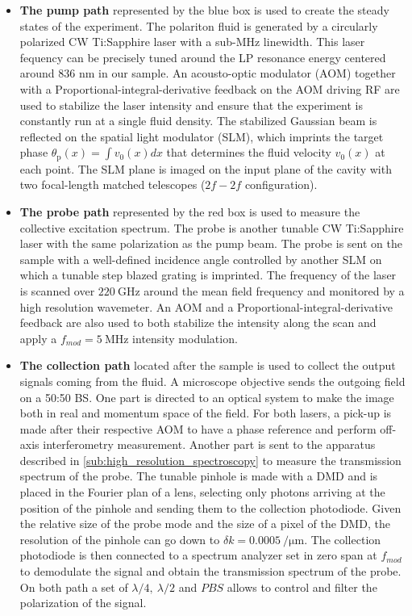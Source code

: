  \begin{itemize}
    \item \textbf{The pump path} represented by the blue box is used to create the steady states of the experiment. The polariton fluid is generated by a circularly polarized CW Ti:Sapphire laser with a sub-MHz linewidth. This laser fequency can be precisely tuned around the LP resonance energy centered around 836 nm in our sample. An acousto-optic modulator (AOM) 
    together with a Proportional-integral-derivative feedback on the AOM driving RF are used to stabilize the laser intensity and ensure that the experiment is constantly run at a single fluid density.
    The stabilized Gaussian beam is reflected on the spatial light modulator (SLM), which imprints the target phase $\theta_\mathrm{p}(x)=\int v_0(x)dx$ that determines the fluid velocity $v_0(x)$ at each point. The SLM plane is imaged on the input plane of the cavity with two focal-length matched telescopes ($2f-2f$ configuration).
    \item \textbf{The probe path} represented by the red box is used to measure the collective excitation spectrum. The probe is another tunable CW Ti:Sapphire laser with the same polarization as the pump beam. The probe is sent on the sample with a well-defined incidence angle controlled by another SLM on which a tunable step blazed grating is imprinted. The frequency of
    the laser is scanned over $\SI{220}{\giga\hertz}$ around the mean field frequency and monitored by a high resolution wavemeter. An AOM and a Proportional-integral-derivative feedback are also used to both stabilize the intensity along the scan and apply a $f_{mod}=\SI{5}{\mega\hertz}$ intensity modulation.
    \item \textbf{The collection path} located after the sample is used to collect the output signals coming from the fluid. A microscope objective sends the outgoing field on a 50:50 BS. One part is directed to an optical system to make the image both in real and momentum space of the field. For both lasers, a pick-up is made after their respective AOM to have a phase reference and perform off-axis interferometry measurement. Another part is sent to the apparatus described in \autoref{sub:high_resolution_spectroscopy} to measure the transmission spectrum of the probe. The tunable
    pinhole is made with a DMD and is placed in the Fourier plan of a lens, selecting only photons arriving at the position of the pinhole and sending them to the collection photodiode. Given 
    the relative size of the probe mode and the size of a pixel of the DMD, the resolution of the pinhole can go down to $\delta k = \SI{0.0005}{\per \micro\meter}$. The collection photodiode is then connected to a spectrum analyzer set in zero span at $f_{mod}$ to demodulate the signal and obtain the transmission spectrum of the probe. On both path
    a set of $\lambda/4,\ \lambda/2$ and $PBS$ allows to control and filter the polarization of the signal.  
 \end{itemize}

